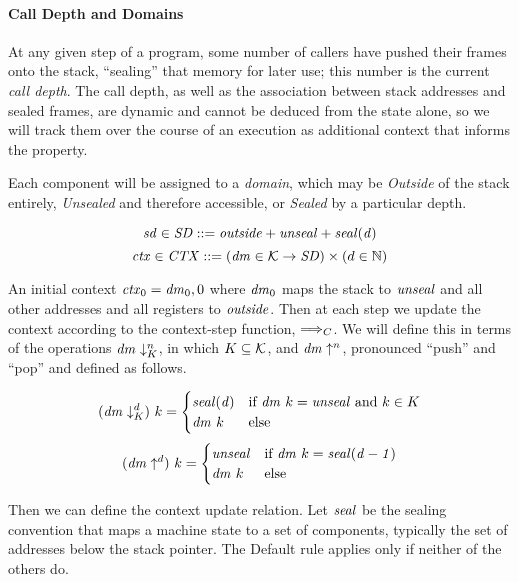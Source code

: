 \documentclass[acmsmall,review,anonymous]{acmart}\settopmatter{printfolios=true,printccs=false,printacmref=false}
\begin{document}
\paragraph*{Call Depth and Domains}

At any given step of a program, some number of callers have pushed their frames
onto the stack, ``sealing'' that memory for later use; this number is the current
{\em call depth}. The call depth, as well as the association between stack addresses
and sealed frames, are dynamic and cannot be deduced from the state alone, so we will
track them over the course of an execution as additional context that informs the property.

Each component will be assigned to a {\em domain}, which may be {\em Outside} of the
stack entirely, {\em Unsealed} and therefore accessible, or {\em Sealed} by a particular
depth.

\[\mathit{sd} \in \mathit{SD} ::= \mathit{outside} + \mathit{unseal} + \mathit{seal(d)}\]
\[\mathit{ctx} \in \mathit{CTX} ::= (\mathit{dm} \in {\mathcal K} \rightarrow \mathit{SD})
  \times (d \in \mathbb{N}) \]

An initial context \(\mathit{ctx}_0 = \mathit{dm}_0, 0\) where \(\mathit{dm}_0\) maps
the stack to \(\mathit{unseal}\) and all other addresses and all registers to \(\mathit{outside}\).
Then at each step we update the context according to the context-step function,
\(\Longrightarrow_C\). We will define this in terms of the operations
\(\mathit{dm} \downarrow^{n}_{K}\), in which \(K \subseteq {\mathcal K}\),
and \(\mathit{dm} \uparrow^{n}\), pronounced ``push'' and ``pop'' and defined as follows.

\[
(\mathit{dm} \downarrow^{d}_{K}) ~ k =
\begin{cases}
  \mathit{seal(d)} & \text{if } \mathit{dm} ~ k = \mathit{unseal}
                    \text{ and } k \in K \\
  \mathit{dm} ~ k & \text{else} \\
\end{cases}
\]
\[
(\mathit{dm} \uparrow^{d}) ~ k =
\begin{cases}
  \mathit{unseal} & \text{if } \mathit{dm} ~ k = \mathit{seal(d-1)} \\
  \mathit{dm} ~ k & \text{else} \\
\end{cases}
\]

Then we can define the context update relation. Let \(\mathit{seal}\) be the sealing convention
that maps a machine state to a set of components, typically the set of addresses below
the stack pointer. The {\sc Default} rule applies only if neither of the others do.
\end{document}
